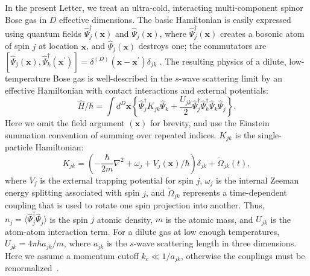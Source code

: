 \documentclass[aps,prl,twocolumn,showpacs,amsmath,amssymb,superscriptaddress,flushbottom,noraggedfooter]{revtex4-1}
\newcommand{\xvec}{\boldsymbol{x}}
\begin{document}
In the present Letter, we treat an ultra-cold,
interacting multi-component spinor Bose gas in $D$ effective dimensions.
The basic Hamiltonian is easily expressed using quantum fields
$\widehat{\Psi}_j^{\dagger}(\xvec)$ and $\widehat{\Psi}_j(\xvec)$,
where $\widehat{\Psi}_j^{\dagger}(\xvec)$ creates a bosonic atom of spin $j$
at location $\xvec$, and $\widehat{\Psi}_j(\xvec)$ destroys one;
the commutators are
$[\widehat{\Psi}_j(\xvec),\widehat{\Psi}_k^{\dagger}(\xvec^\prime)] =
\delta^{(D)}(\xvec-\xvec^\prime)\delta_{jk}\,\,.$
The resulting physics of a dilute, low-temperature Bose gas
is well-described in the $s$-wave scattering limit by an effective Hamiltonian
with contact interactions and external potentials:
\begin{equation}
	\hat{H} / \hbar = \int d^{D}\xvec \left\{
		\widehat{\Psi}_j^{\dagger} K_{jk} \widehat{\Psi}_k +
		\frac{U_{jk}}{2} \widehat{\Psi}_j^{\dagger} \widehat{\Psi}_k^{\dagger}
		\widehat{\Psi}_k \widehat{\Psi}_j
	\right\}.
\end{equation}
Here we omit the field argument $(\xvec)$ for brevity,
and use the Einstein summation convention of summing over repeated indices.
$K_{jk}$ is the single-particle Hamiltonian:
\begin{equation}
	K_{jk} = \left( -\frac{\hbar}{2m} \nabla^2 + \omega_j + V_j(\xvec) / \hbar \right) \delta_{jk} +
		\tilde{\Omega}_{jk}(t),
\end{equation}
where $V_j$ is the external trapping potential for spin $j$,
$\omega_j$ is the internal Zeeman energy splitting associated with spin $j$,
and $\tilde{\Omega}_{jk}$ represents a time-dependent coupling
that is used to rotate one spin projection into another.
Thus, $n_j = \langle \widehat{\Psi}_j^{\dagger} \widehat{\Psi}_j \rangle$
is the spin $j$ atomic density, $m$ is the atomic mass,
and $U_{jk}$ is the atom-atom interaction term.
For a dilute gas at low enough temperatures,
$U_{jk}=4\pi\hbar a_{jk} / m$, where $a_{jk}$ is the $s$-wave scattering length in three dimensions.
Here we assume a momentum cutoff $k_{c} \ll 1 / a_{jk}$,
otherwise the couplings must be renormalized~\cite{Sinatra2002}.
\end{document}
